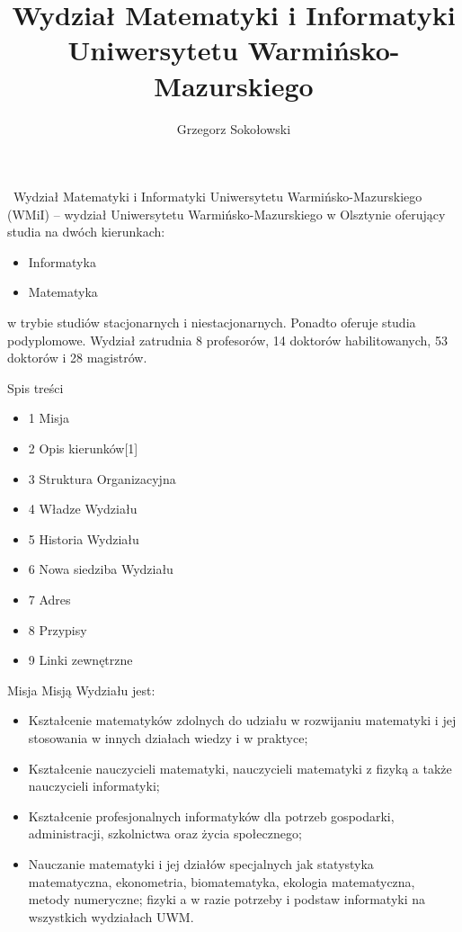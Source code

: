 \documentclass[a4paper,12pt]{article}
\title{{\bf Wydział Matematyki i Informatyki Uniwersytetu Warmińsko-Mazurskiego} \\}
\author{Grzegorz Sokołowski}
\begin{document}
\maketitle

\begin{abstract}

\end{abstract}

\section{}

~Wydział Matematyki i Informatyki Uniwersytetu Warmińsko-Mazurskiego (WMiI) – wydział
Uniwersytetu Warmińsko-Mazurskiego w Olsztynie oferujący studia na dwóch kierunkach:
\begin{itemize}
\item Informatyka
\item Matematyka
\end{itemize}
w trybie studiów stacjonarnych i niestacjonarnych. Ponadto oferuje studia podyplomowe.
Wydział zatrudnia 8 profesorów, 14 doktorów habilitowanych, 53 doktorów i 28 magistrów.

Spis treści
\begin{itemize}
\item 1 Misja
\item 2 Opis kierunków[1]
\item 3 Struktura Organizacyjna
\item 4 Władze Wydziału
\item 5 Historia Wydziału
\item 6 Nowa siedziba Wydziału
\item 7 Adres
\item 8 Przypisy
\item 9 Linki zewnętrzne
\end{itemize}



Misja
Misją Wydziału jest:
\begin{itemize}
\item Kształcenie matematyków zdolnych do udziału w rozwijaniu matematyki i jej stosowania w innych
działach wiedzy i w praktyce;
\item Kształcenie nauczycieli matematyki, nauczycieli matematyki z fizyką a także nauczycieli informatyki;
\item Kształcenie profesjonalnych informatyków dla potrzeb gospodarki, administracji, szkolnictwa oraz życia
społecznego;
\item Nauczanie matematyki i jej działów specjalnych jak statystyka matematyczna, ekonometria,
biomatematyka, ekologia matematyczna, metody numeryczne; fizyki a w razie potrzeby i podstaw
informatyki na wszystkich wydziałach UWM.
\end{itemize}
\end{document}

